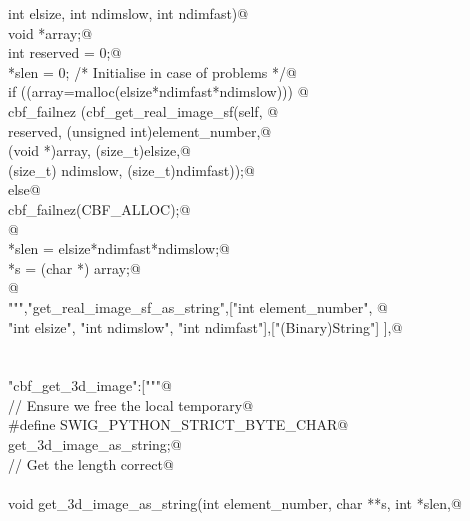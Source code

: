 \documentclass[10pt,a4paper,twoside,notitlepage]{article}
\begin{document}
\begin{flushleft}
\begin{minipage}{\linewidth}
\begin{list}{}{}
\mbox{}\verb@    int elsize, int ndimslow, int ndimfast){@\\
\mbox{}\verb@        void *array;@\\
\mbox{}\verb@        int reserved = 0;@\\
\mbox{}\verb@        *slen = 0; /* Initialise in case of problems */@\\
\mbox{}\verb@        if ((array=malloc(elsize*ndimfast*ndimslow))) {@\\
\mbox{}\verb@               cbf_failnez (cbf_get_real_image_sf(self, @\\
\mbox{}\verb@               reserved, (unsigned int)element_number,@\\
\mbox{}\verb@               (void *)array, (size_t)elsize,@\\
\mbox{}\verb@               (size_t) ndimslow, (size_t)ndimfast));@\\
\mbox{}\verb@         }else{@\\
\mbox{}\verb@               cbf_failnez(CBF_ALLOC);@\\
\mbox{}\verb@         }@\\
\mbox{}\verb@        *slen = elsize*ndimfast*ndimslow;@\\
\mbox{}\verb@        *s = (char *) array;@\\
\mbox{}\verb@      }@\\
\mbox{}\verb@""","get_real_image_sf_as_string",["int element_number", @\\
\mbox{}\verb@    "int elsize", "int ndimslow", "int ndimfast"],["(Binary)String"] ],@\\
\mbox{}\verb@@\\
\mbox{}\verb@@\\
\mbox{}\verb@"cbf_get_3d_image":["""@\\
\mbox{}\verb@// Ensure we free the local temporary@\\
\mbox{}\verb@%{@\\
\mbox{}\verb@#define SWIG_PYTHON_STRICT_BYTE_CHAR@\\
\mbox{}\verb@%}@\\
\mbox{}\verb@%cstring_output_allocate_size(char ** s, int *slen, free(*$1))@\\
\mbox{}\verb@       get_3d_image_as_string;@\\
\mbox{}\verb@// Get the length correct@\\
\mbox{}\verb@@\\
\mbox{}\verb@    void get_3d_image_as_string(int element_number, char **s, int *slen,@\\

\end{list}
\end{minipage}
\end{flushleft}
\end{document}
